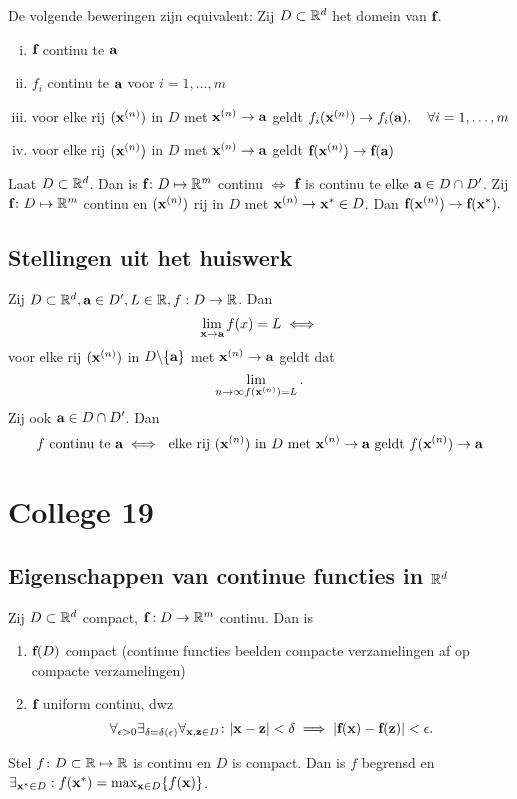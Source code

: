 \documentclass{2wa40summary}
\begin{document}
	 De volgende beweringen zijn equivalent: Zij $D\subset\mathbb{R}^d$ het domein van ${\textbf{f}}$.
	\begin{enumerate}[(i)]
		\item ${\textbf{f}}$ continu te ${\textbf{a}}$
		\item $f_i$ continu te ${\textbf{a}}$ voor $i=1,\ldots,m$
		\item voor elke rij $({\textbf{x}}^{(n)})$ in $D$ met ${\textbf{x}}^{(n)}\to{\textbf{a}}$ geldt $f_i({\textbf{x}}^{(n)}) \to f_i({\textbf{a}}),\quad\forall i=1,\ldots,m$
		\item voor elke rij $({\textbf{x}}^{(n)})$ in $D$ met ${\textbf{x}}^{(n)}\to{\textbf{a}}$ geldt ${\textbf{f}}({\textbf{x}}^{(n)})\to{\textbf{f}}({\textbf{a}})$
	\end{enumerate}
	
	Laat $D \subset \mathbb{R}^d$. Dan is ${\textbf{f}}\colon D \mapsto \mathbb{R}^m$ continu $\iff$ ${\textbf{f}}$ is continu te elke ${\textbf{a}}\in D\cap D'$.
	\opm Zij ${\textbf{f}}\colon D\mapsto \mathbb{R}^m$ continu en $({\textbf{x}}^{(n)})$ rij in $D$ met ${\textbf{x}}^{(n)} \to {\textbf{x}}^* \in D$.
	Dan ${\textbf{f}}({\textbf{x}}^{(n)}) \to {\textbf{f}}({\textbf{x}}^*).$
	\subsection{Stellingen uit het huiswerk}
	\theorem Zij $D \subset \mathbb{R}^d, {\textbf{a}} \in D', L \in \mathbb{R}, f:D \rightarrow \mathbb{R}$. Dan
	\[
	\lim_{{\textbf{x}}\to{\textbf{a}}}f(x)=L \iff
	\]
	voor elke rij $({\textbf{x}}^{(n)})$ in $D\backslash\lbrace{\textbf{a}}\rbrace$ met ${\textbf{x}}^{(n)}\to{\textbf{a}}$ geldt dat
	\[
	\lim_{n\to\infty f({\textbf{x}}^{(n)}) = L}.
	\]
	Zij ook ${\textbf{a}} \in D \cap D'$. Dan
	\[f \text{ continu te } {\textbf{a}} \iff \text{ elke rij }({\textbf{x}}^{(n)}) \text{ in } D \text{ met } {\textbf{x}}^{(n)}\to{\textbf{a}} \text{ geldt } f({\textbf{x}}^{(n)}) \to{\textbf{a}}\]
	
	\newpage
	\section{College 19}
	\subsection{Eigenschappen van continue functies in $\mathbb{R}^d$}
	\begin{theorem}
		Zij $D \subset \mathbb{R}^d$ compact, ${\textbf{f}}:D\rightarrow\mathbb{R}^m$ continu. Dan is
		\begin{enumerate}[(1)]
			\item ${\textbf{f}}(D)$ compact (continue functies beelden compacte verzamelingen af op compacte verzamelingen)
			\item ${\textbf{f}}$ uniform continu, dwz
			\[\forall_{\epsilon > 0} \exists_{\delta = \delta(\epsilon)}\forall_{\x,\z\in D}\colon
			\abs{\x-\z}<\delta \implies |\f(\x)-\f(\z)|<\epsilon.
			\]
		\end{enumerate}
	\end{theorem}
	Stel $f\colon D\subset\mathbb{R}\mapsto\mathbb{R}$ is continu
	en $D$ is compact. Dan is $f$ begrensd en $\exists_{{\textbf{x}}^* \in D}:f({\textbf{x}}^*)=\max_{{\textbf{x}}\in D}\lbrace f({\textbf{x}})\rbrace$.
	
\end{document}
